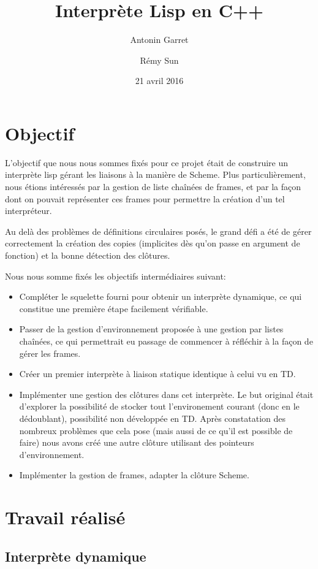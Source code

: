 \documentclass[a4paper,11pt]{article}
\title{Interprète Lisp en C++}
\author{Antonin Garret \and Rémy Sun}
\date{21 avril 2016}
\begin{document}
\maketitle

\section{Objectif}

L'objectif que nous nous sommes fixés pour ce projet était de construire un
interprète lisp gérant les liaisons à la manière de Scheme. Plus
particulièrement, nous étions intéressés par la gestion de liste chaînées de
frames, et par la façon dont on pouvait représenter ces frames pour permettre la
création d'un tel interpréteur.

Au delà des problèmes de définitions circulaires posés, le grand défi a été de
gérer correctement la création des copies (implicites dès qu'on passe en
argument de fonction) et la bonne détection des clôtures.

Nous nous somme fixés les objectifs intermédiaires suivant:
\begin{itemize}
\item Compléter le squelette fourni pour obtenir un interprète dynamique, ce qui
  constitue une première étape facilement vérifiable.
\item Passer de la gestion d'environnement proposée à une gestion par listes
  chaînées, ce qui permettrait eu passage de commencer à réfléchir à la façon de
  gérer les frames.
\item Créer un premier interprète à liaison statique identique à celui vu en TD.
\item Implémenter une gestion des clôtures dans cet interprète. Le but original
  était d'explorer la possibilité de stocker tout l'environement courant (donc
  en le dédoublant), possibilité non développée en TD. Après constatation des
  nombreux problèmes que cela pose (mais aussi de ce qu'il est possible de
  faire) nous avons créé une autre clôture utilisant des pointeurs
  d’environnement.
\item Implémenter la gestion de frames, adapter la clôture Scheme.
\end{itemize}


\section{Travail réalisé}

\subsection{Interprète dynamique}
\end{document}
